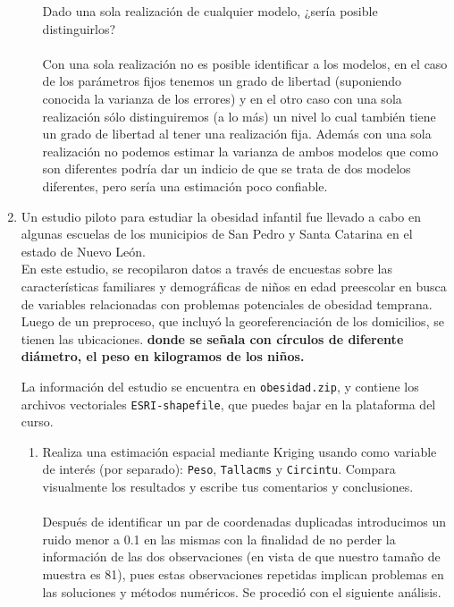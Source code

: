 \documentclass[paper=letter, fontsize=11pt]{scrartcl}
\numberwithin{equation}{section} %
\numberwithin{figure}{section} %
\numberwithin{table}{section} %
\begin{document}
\begin{enumerate}
\begin{enumerate}
Dado una sola realización de cualquier modelo, ¿sería posible distinguirlos?\\\\
Con una sola realización no es posible identificar a los modelos, en el caso de los parámetros fijos tenemos un grado de libertad (suponiendo conocida la varianza de los errores) y en el otro caso con una sola realización sólo distinguiremos (a lo más) un nivel lo cual también tiene un grado de libertad al tener una realización fija. Además con una sola realización no podemos estimar la varianza de ambos modelos que como son diferentes podría dar un indicio de que se trata de dos modelos diferentes, pero sería una estimación poco confiable.



\end{enumerate}


\item Un estudio piloto para estudiar la obesidad infantil fue llevado a cabo en algunas escuelas de los municipios de San Pedro y Santa Catarina en el estado de Nuevo León.\\
  En este estudio, se recopilaron datos a través de encuestas sobre las características familiares y demográficas de ni\~nos en edad preescolar en busca de variables relacionadas con problemas potenciales de obesidad temprana. Luego de un preproceso, que incluyó la georeferenciación de los domicilios, se tienen las ubicaciones.\textbf{ donde se se\~nala con círculos de diferente diámetro, el peso en kilogramos de los ni\~nos.}

  La información del estudio se encuentra en \verb|obesidad.zip|, y contiene los archivos vectoriales \verb|ESRI-shapefile|, que puedes bajar en la plataforma del curso.
  

  \begin{enumerate}
  \item Realiza una estimación espacial mediante Kriging usando como variable de interés (por separado): \verb|Peso|, \verb|Tallacms| y \verb|Circintu|. Compara visualmente los resultados y escribe tus comentarios y conclusiones.\\\\

Después de identificar un par de coordenadas duplicadas introducimos un ruido menor a 0.1 en las mismas con la finalidad de no perder la información de las dos observaciones (en vista de que nuestro tamaño de muestra es 81), pues estas observaciones repetidas implican problemas en las soluciones y métodos numéricos. Se procedió con el siguiente análisis.\\


\end{enumerate}
\end{enumerate}
\end{document}

